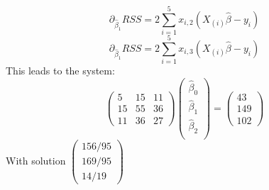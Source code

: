 \documentclass[12pt]{article}
\begin{document}
\begin{equation*}
    \partial_{\hat\beta_1}RSS = 2\sum_{i = 1}^{5}x_{i,2}(X_{(i)}\hat\beta - y_i)
\end{equation*}
\begin{equation*}
    \partial_{\hat\beta_1}RSS = 2\sum_{i = 1}^{5}x_{i,3}(X_{(i)}\hat\beta - y_i)
\end{equation*}
This leads to the system: \begin{equation*}
    \begin{pmatrix}
        5 & 15 & 11 \\ 15 & 55 & 36 \\ 11 & 36 & 27
    \end{pmatrix}\begin{pmatrix}
        \hat\beta_0 \\ \hat\beta_1 \\ \hat\beta_2 \\
    \end{pmatrix} = \begin{pmatrix}
        43 \\ 149 \\ 102
    \end{pmatrix}
\end{equation*}
With solution $\begin{pmatrix}
    156/95 \\ 169/95 \\ 14/19
\end{pmatrix}$
\end{document}
